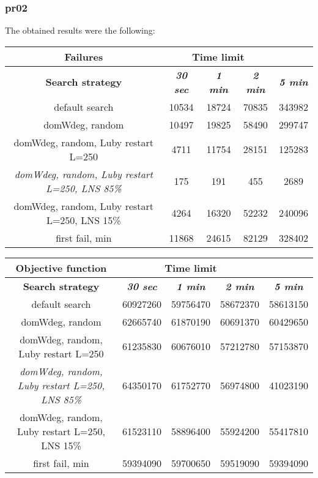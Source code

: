 \subsubsection{pr02}
The obtained results were the following:
{
\renewcommand{\arraystretch}{2}
\begin{longtable}[h]{| c | c | c | c | c |}
    \hline
    \textbf{Failures} & \multicolumn{3}{c}{Time limit} & \\
    \hline
    \textbf{Search strategy} & \textbf{\textit{30 sec}} & \textbf{\textit{1 min}} & \textbf{\textit{2 min}} & \textbf{\textit{5 min}} \\
    \hline
    \endhead
    default search                                         & 10534 & 18724 & 70835 & 343982 \\
    \hline
    domWdeg, random                                        & 10497 & 19825 & 58490 & 299747 \\
    \hline
    domWdeg, random, Luby restart L=250                    &  4711 & 11754 & 28151 & 125283 \\
    \hline
    \textit{domWdeg, random, Luby restart L=250, LNS 85\%} &   175 &   191 &   455 &   2689 \\
    \hline
    domWdeg, random, Luby restart L=250, LNS 15\%          &  4264 & 16320 & 52232 & 240096 \\
    \hline
    first fail, min                                        & 11868 & 24615 & 82129 & 328402 \\
    \hline
\end{longtable}
}

{
\renewcommand{\arraystretch}{2}
\begin{longtable}[h]{| c | c | c | c | c |}
    \hline
    \textbf{Objective function} & \multicolumn{3}{c}{Time limit} & \\
    \hline
    \textbf{Search strategy} & \textbf{\textit{30 sec}} & \textbf{\textit{1 min}} & \textbf{\textit{2 min}} & \textbf{\textit{5 min}} \\
    \hline
    \endhead
    default search                                         & 60927260 & 59756470 & 58672370 & 58613150 \\
    \hline
    domWdeg, random                                        & 62665740 & 61870190 & 60691370 & 60429650 \\
    \hline
    domWdeg, random, Luby restart L=250                    & 61235830 & 60676010 & 57212780 & 57153870 \\
    \hline
    \textit{domWdeg, random, Luby restart L=250, LNS 85\%} & 64350170 & 61752770 & 56974800 & 41023190 \\
    \hline
    domWdeg, random, Luby restart L=250, LNS 15\%          & 61523110 & 58896400 & 55924200 & 55417810 \\
    \hline
    first fail, min                                        & 59394090 & 59700650 & 59519090 & 59394090 \\
    \hline
\end{longtable}
}